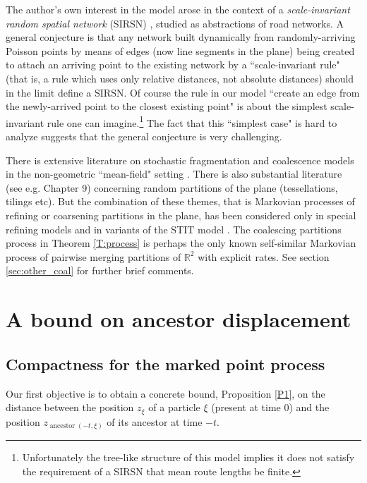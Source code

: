 \documentclass[12pt]{article}
\newcommand{\Reals}{{\mathbb{R}}}
\DeclareMathOperator{\ancestor}{ancestor}
\begin{document}
 

 The author's own interest in the model arose in the context of a 
{\em  scale-invariant random spatial network} (SIRSN)
\cite{MR3164768,MR3082274}, studied as abstractions of road networks.  
A general conjecture is that any network built dynamically from randomly-arriving Poisson points by means of edges (now line segments in the plane)  being created to attach an arriving point to the existing network  by a ``scale-invariant rule" (that is, a rule which uses only relative distances, not absolute distances) 
should in the limit define a SIRSN.  
Of course the rule in our model ``create an edge from the newly-arrived point to the closest existing point" is about the simplest scale-invariant rule one  can imagine.\footnote{Unfortunately the tree-like structure of this model implies it does not satisfy the   
requirement of a SIRSN that mean route lengths be finite.}   
The fact that this ``simplest case" is hard to analyze suggests that  the general conjecture is very challenging.

There is extensive literature on stochastic fragmentation and coalescence models in the non-geometric ``mean-field" setting 
\cite{me-coal,bertoin}.
There is also substantial literature (see e.g. \cite{kendall_book} Chapter 9) concerning random partitions of the plane (tessellations, tilings etc).
But the combination of these themes, that is  Markovian processes of refining or coarsening partitions in the plane,
has been considered only in special refining models \cite{cowan} and in variants of the STIT model \cite{schreiber,thale}.  
The coalescing partitions process in  Theorem \ref{T:process}  is perhaps the only known self-similar Markovian process of pairwise merging partitions of $\Reals^2$ with explicit rates.
See section \ref{sec:other_coal} for further brief comments.  






\section{A bound on ancestor displacement}
\label{sec:part1}
\subsection{Compactness for the marked point process}
Our first objective is to obtain a concrete bound, Proposition \ref{P1}, on the distance between the position $z_\xi$ of a particle $\xi$ (present at time $0$) and the 
position $z_{\ancestor(-t,\xi)}$ of its ancestor at time $-t$.
\end{document}
